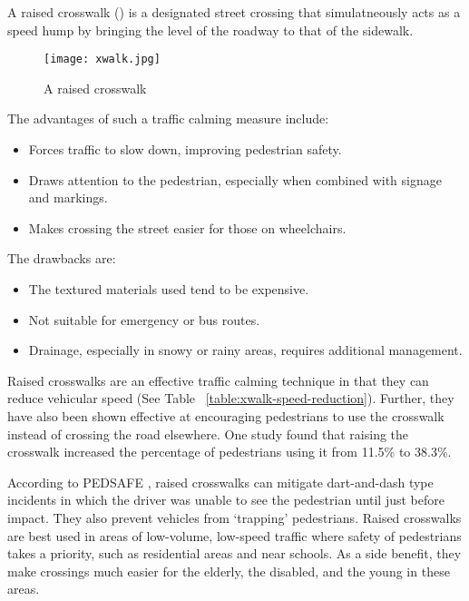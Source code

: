 A raised crosswalk () is a designated street crossing that simulatneously acts as a speed hump by bringing the level of the roadway to that of the sidewalk.

\begin{figure}[h]
	\centering
	\texttt{[image: xwalk.jpg]}
	\caption{A raised crosswalk\cite{kimley-xwalk}}\label{fig:xwalk}
\end{figure}

The advantages of such a traffic calming measure include:\begin{itemize}
	\item Forces traffic to slow down, improving pedestrian safety.
	\item Draws attention to the pedestrian, especially when combined with signage and markings.
	\item Makes crossing the street easier for those on wheelchairs.
\end{itemize}

The drawbacks are:\begin{itemize}
	\item The textured materials used tend to be expensive.
	\item Not suitable for emergency or bus routes.
	\item Drainage, especially in snowy or rainy areas, requires additional management.
\end{itemize}


Raised crosswalks are an effective traffic calming technique in that they can reduce vehicular speed (See Table ~\ref{table:xwalk-speed-reduction}). Further, they have also been shown effective at encouraging pedestrians to use the crosswalk instead of crossing the road elsewhere. One study \cite{pedsafe-xwalks} found that raising the crosswalk increased the percentage of pedestrians using it from 11.5\% to 38.3\%. 



According to PEDSAFE \cite{pedsafe-xwalks}, raised crosswalks can mitigate dart-and-dash type incidents in which the driver was unable to see the pedestrian until just before impact. They also prevent vehicles from `trapping' pedestrians. Raised crosswalks are best used in areas of low-volume, low-speed traffic where safety of pedestrians takes a priority, such as residential areas and near schools. As a side benefit, they make crossings much easier for the elderly, the disabled, and the young in these areas.

